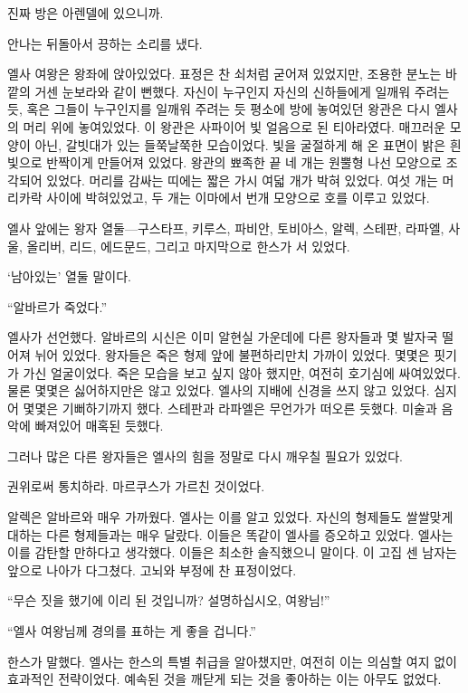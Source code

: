 진짜 방은 아렌델에 있으니까.

안나는 뒤돌아서 끙하는 소리를 냈다.

\textbreak

엘사 여왕은 왕좌에 앉아있었다. 표정은 찬 쇠처럼 굳어져 있었지만, 조용한 분노는 바깥의 거센 눈보라와 같이 뻔했다. 자신이 누구인지 자신의 신하들에게 일깨워 주려는 듯, 혹은 그들이 누구인지를 일깨워 주려는 듯 평소에 방에 놓여있던 왕관은 다시 엘사의 머리 위에 놓여있었다. 이 왕관은 사파이어 빛 얼음으로 된 티아라였다. 매끄러운 모양이 아닌, 갈빗대가 있는 들쭉날쭉한 모습이었다. 빛을 굴절하게 해 온 표면이 밝은 흰 빛으로 반짝이게 만들어져 있었다. 왕관의 뾰족한 끝 네 개는 원뿔형 나선 모양으로 조각되어 있었다. 머리를 감싸는 띠에는 짧은 가시 여덟 개가 박혀 있었다. 여섯 개는 머리카락 사이에 박혀있었고, 두 개는 이마에서 번개 모양으로 호를 이루고 있었다.

엘사 앞에는 왕자 열둘—구스타프, 키루스, 파비안, 토비아스, 알렉, 스테판, 라파엘, 사울, 올리버, 리드, 에드문드, 그리고 마지막으로 한스가 서 있었다.

`남아있는' 열둘 말이다.

``알바르가 죽었다.''

엘사가 선언했다. 알바르의 시신은 이미 알현실 가운데에 다른 왕자들과 몇 발자국 떨어져 뉘어 있었다. 왕자들은 죽은 형제 앞에 불편하리만치 가까이 있었다. 몇몇은 핏기가 가신 얼굴이었다. 죽은 모습을 보고 싶지 않아 했지만, 여전히 호기심에 싸여있었다. 물론 몇몇은 싫어하지만은 않고 있었다. 엘사의 지배에 신경을 쓰지 않고 있었다. 심지어 몇몇은 기뻐하기까지 했다. 스테판과 라파엘은 무언가가 떠오른 듯했다. 미술과 음악에 빠져있어 매혹된 듯했다.

그러나 많은 다른 왕자들은 엘사의 힘을 정말로 다시 깨우칠 필요가 있었다.

권위로써 통치하라. 마르쿠스가 가르친 것이었다.

알렉은 알바르와 매우 가까웠다. 엘사는 이를 알고 있었다. 자신의 형제들도 쌀쌀맞게 대하는 다른 형제들과는 매우 달랐다. 이들은 똑같이 엘사를 증오하고 있었다. 엘사는 이를 감탄할 만하다고 생각했다. 이들은 최소한 솔직했으니 말이다. 이 고집 센 남자는 앞으로 나아가 다그쳤다. 고뇌와 부정에 찬 표정이었다.

``무슨 짓을 했기에 이리 된 것입니까? 설명하십시오, 여왕님!''

``엘사 여왕님께 경의를 표하는 게 좋을 겁니다.''

한스가 말했다. 엘사는 한스의 특별 취급을 알아챘지만, 여전히 이는 의심할 여지 없이 효과적인 전략이었다. 예속된 것을 깨닫게 되는 것을 좋아하는 이는 아무도 없었다.

